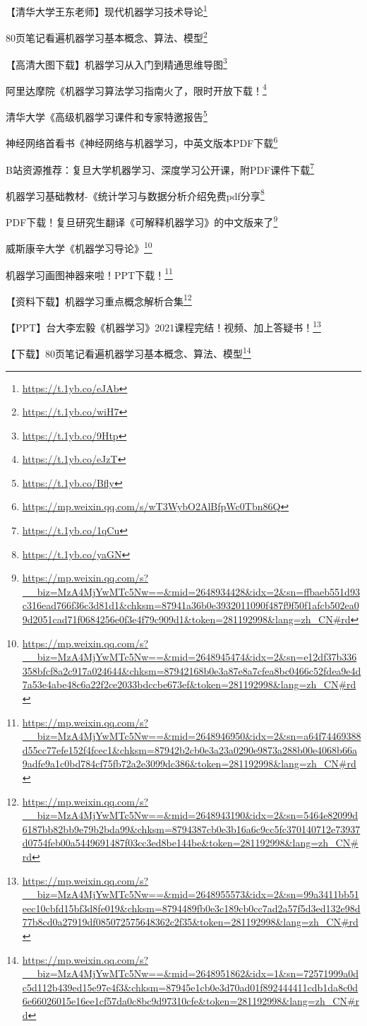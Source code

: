 \documentclass[]{ctexbook}
\renewcommand{\href}[2]{#2\footnote{\url{#1}}}
\begin{document}
\href{https://t.1yb.co/eJAb}{【清华大学王东老师】现代机器学习技术导论}

\href{https://t.1yb.co/wiH7}{80页笔记看遍机器学习基本概念、算法、模型}

\href{https://t.1yb.co/9Htp}{【高清大图下载】机器学习从入门到精通思维导图}

\href{https://t.1yb.co/eJzT}{阿里达摩院《机器学习算法学习指南火了，限时开放下载！}

\href{https://t.1yb.co/Bfly}{清华大学《高级机器学习课件和专家特邀报告}

\href{https://mp.weixin.qq.com/s/wT3WybO2AlBfpWc0Tbn86Q}{神经网络首看书《神经网络与机器学习，中英文版本PDF下载}

\href{https://t.1yb.co/1qCu}{B站资源推荐：复旦大学机器学习、深度学习公开课，附PDF课件下载}

\href{https://t.1yb.co/yaGN}{机器学习基础教材-《统计学习与数据分析介绍免费pdf分享}

\href{https://mp.weixin.qq.com/s?__biz=MzA4MjYwMTc5Nw==\&mid=2648934428\&idx=2\&sn=ffbaeb551d93c316ead766f36c3d81d1\&chksm=87941a36b0e3932011090f487f9f50f1afcb502ea09d2051cad71f0684256e0f3e4f79c909d1\&token=281192998\&lang=zh_CN\#rd}{PDF下载！复旦研究生翻译《可解释机器学习》的中文版来了}

\href{https://mp.weixin.qq.com/s?__biz=MzA4MjYwMTc5Nw==\&mid=2648945474\&idx=2\&sn=e12df37b336358bfcf8a2c917a024644\&chksm=87942168b0e3a87e8a7cfea8bc0466c52fdea9e4d7a53e4abe48c6a22f2ce2033bdccbe673ef\&token=281192998\&lang=zh_CN\#rd}{威斯康辛大学《机器学习导论》}

\href{https://mp.weixin.qq.com/s?__biz=MzA4MjYwMTc5Nw==\&mid=2648946950\&idx=2\&sn=a64f74469388d55cc77efe152f4fcec1\&chksm=87942b2cb0e3a23a0290e9873a288b00e4068b66a9adfe9a1c0bd784cf75fb72a2e3099dc386\&token=281192998\&lang=zh_CN\#rd}{机器学习画图神器来啦！PPT下载！}

\href{https://mp.weixin.qq.com/s?__biz=MzA4MjYwMTc5Nw==\&mid=2648943190\&idx=2\&sn=5464e82099d6187bb82bb9e79b2bda99\&chksm=8794387cb0e3b16a6c9cc5fc370140712e73937d0754feb00a5449691487f03cc3ed8be144be\&token=281192998\&lang=zh_CN\#rd}{【资料下载】机器学习重点概念解析合集}

\href{https://mp.weixin.qq.com/s?__biz=MzA4MjYwMTc5Nw==\&mid=2648955573\&idx=2\&sn=99a3411bb51eec10cbfd15bf3d8fe019\&chksm=8794489fb0e3c189cb0cc7ad2a57f5d3ed132e98d77b8cd0a27919df085072575648362c2f35\&token=281192998\&lang=zh_CN\#rd}{【PPT】台大李宏毅《机器学习》2021课程完结！视频、加上答疑书！}

\href{https://mp.weixin.qq.com/s?__biz=MzA4MjYwMTc5Nw==\&mid=2648951862\&idx=1\&sn=72571999a0dc5d112b439ed15e97e4f3\&chksm=87945e1cb0e3d70ad01f892444411cdb1da8c0d6e66026015e16ee1cf57da0c8bc9d97310cfe\&token=281192998\&lang=zh_CN\#rd}{【下载】80页笔记看遍机器学习基本概念、算法、模型}
\end{document}
